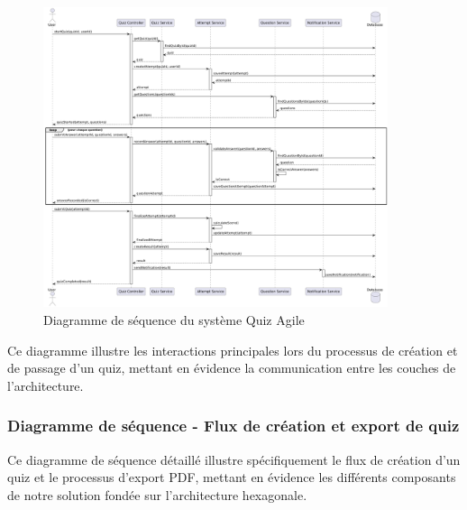 \documentclass[12pt,a4paper]{report}
\begin{document}
\begin{figure}[H]
\centering
\includegraphics[width=0.9\textwidth]{latex_media/media/image19.png}
\caption{Diagramme de séquence du système Quiz Agile}
\label{fig:diagramme-sequence}
\end{figure}

Ce diagramme illustre les interactions principales lors du processus de création et de passage d'un quiz, mettant en évidence la communication entre les couches de l'architecture.

\subsubsection{Diagramme de séquence - Flux de création et export de quiz}

Ce diagramme de séquence détaillé illustre spécifiquement le flux de création d'un quiz et le processus d'export PDF, mettant en évidence les différents composants de notre solution fondée sur l'architecture hexagonale.
\end{document}
